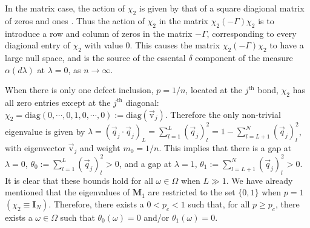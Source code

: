 \documentclass[jmp,graphicx]{revtex4-1}
\begin{document}
In the matrix case, the action of $\chi_2$ is given by that of a square
diagional matrix of zeros and ones \cite{Golden:JoB:337}. Thus
the action of $\chi_2$ in the matrix $\chi_2(-\Gamma)\chi_2$ is to introduce a row
and column of zeros in the matrix $-\Gamma$, corresponding to every
diagional entry of $\chi_2$ with value 0. This causes the matrix
$\chi_2(-\Gamma)\chi_2$ to have a large null space, and is the source of the
essental $\delta$ component of the measure $\alpha(d\lambda)$ at $\lambda=0$, as
$n\to\infty$.

When there is only one defect inclusion, $p=1/n$, located at
the $j^{\text{th}}$ bond, $\chi_2$ has all zero entries except at the $j^{\text{th}}$
diagonal:
$\chi_2=\text{diag}(0,\cdots,0,1,0,\cdots,0):=\text{diag}(\vec{\text{v}}_j)$. Therefore
the only non-trivial eigenvalue is given by 
$\lambda=(\vec{q}_j\cdot\vec{q}_j)_L=\sum_{l=1}^L(\vec{q}_j)_l^2=1-\sum_{l=L+1}^N(\vec{q}_j)_l^2$, 
with eigenvector $\vec{\text{v}}_j$ and weight $m_0=1/n$. This  
implies that there is a gap at $\lambda=0$, $\theta_0:=\sum_{l=1}^L(\vec{q}_j)_l^2>0$,
and a gap at $\lambda=1$, $\theta_1:=\sum_{l=L+1}^N(\vec{q}_j)_l^2>0$. It is clear
that these bounds hold for all $\omega\in\Omega$ when $L\gg1$. We have
already mentioned that the eigenvalues of $\mathbf{M}_1$ are
restricted to the set $\{0,1\}$ when $p=1$
$(\chi_2\equiv\mathbf{I}_N)$. Therefore, there exists a $0<p_c<1$ such that,
for all $p\geq p_c$, there exists a $\omega\in\Omega$ such that $\theta_0(\omega)=0$ and/or
$\theta_1(\omega)=0$.

%
\end{document}
